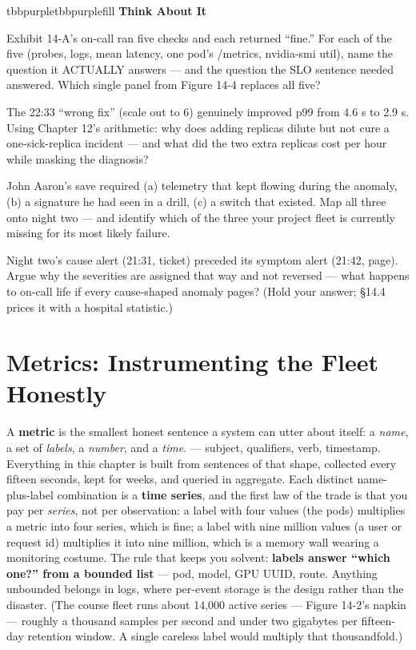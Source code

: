 \begin{calloutbox}{tbbpurple}{tbbpurplefill}
{\normalsize\bfseries\color{tbbpurple}Think About It}\par\vspace{3pt}
\begin{tbbitemize}
  \item Exhibit 14-A’s on-call ran five checks and each returned “fine.” For each of the five (probes, logs, mean latency, one pod’s /metrics, nvidia-smi util), name the question it ACTUALLY answers — and the question the SLO sentence needed answered. Which single panel from Figure 14-4 replaces all five?
  \item The 22:33 “wrong fix” (scale out to 6) genuinely improved p99 from 4.6 s to 2.9 s. Using Chapter 12’s arithmetic: why does adding replicas dilute but not cure a one-sick-replica incident — and what did the two extra replicas cost per hour while masking the diagnosis?
  \item John Aaron’s save required (a) telemetry that kept flowing during the anomaly, (b) a signature he had seen in a drill, (c) a switch that existed. Map all three onto night two — and identify which of the three your project fleet is currently missing for its most likely failure.
  \item Night two’s cause alert (21:31, ticket) preceded its symptom alert (21:42, page). Argue why the severities are assigned that way and not reversed — what happens to on-call life if every cause-shaped anomaly pages? (Hold your answer; §14.4 prices it with a hospital statistic.)
\end{tbbitemize}
\end{calloutbox}

\section{Metrics: Instrumenting the Fleet Honestly}

A \textbf{metric} is the smallest honest sentence a system can utter about itself: a \textit{name}, a set of \textit{labels}, a \textit{number}, and a \textit{time}.  — subject, qualifiers, verb, timestamp. Everything in this chapter is built from sentences of that shape, collected every fifteen seconds, kept for weeks, and queried in aggregate. Each distinct name-plus-label combination is a \textbf{time series}, and the first law of the trade is that you pay per \textit{series}, not per observation: a label with four values (the pods) multiplies a metric into four series, which is fine; a label with nine million values (a user or request id) multiplies it into nine million, which is a memory wall wearing a monitoring costume. The rule that keeps you solvent: \textbf{labels answer “which one?” from a bounded list} — pod, model, GPU UUID, route. Anything unbounded belongs in logs, where per-event storage is the design rather than the disaster. (The course fleet runs about 14,000 active series — Figure 14-2’s napkin — roughly a thousand samples per second and under two gigabytes per fifteen-day retention window. A single careless  label would multiply that thousandfold.)

